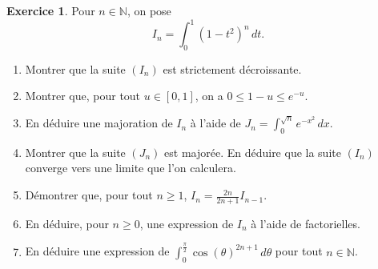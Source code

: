 \documentclass[a4paper, 11pt,openany]{article}%
\theoremstyle{plain}
\theoremstyle{definition}
\newtheorem{exo}{Exercice}
\theoremstyle{remark}
\newcommand{\N}{\mathbb{N}}
\begin{document}
\begin{exo}
Pour $n \in \N$, on pose 
\[ I_n= \int_0^1 (1-t^2)^n \, dt.\]
\begin{enumerate}
\item Montrer que la suite $(I_n)$ est strictement décroissante.
\item Montrer que, pour tout $u \in [0,1]$, on a $0 \leqslant 1-u \leqslant e^{-u}$.
\item En déduire une majoration de $I_n$
à l'aide de 
$J_n = \int_0^{\sqrt{n}} e^{-x^2} \, dx$.
\item Montrer que la suite $(J_n)$
est majorée. En déduire que la suite $(I_n)$
converge vers une limite que l'on calculera.
\item Démontrer que, pour tout $n \geqslant 1$, $I_n= \frac{2n}{2n+1} I_{n-1}$.
\item En déduire, pour $n \geqslant 0$, une expression de $I_n$ à l'aide de factorielles.
\item En déduire une expression de $\int_0^{\frac{\pi}{2}} \cos(\theta)^{2n+1} \, d\theta$ pour tout $n\in \N$.
\end{enumerate}
\end{exo}
\end{document}
